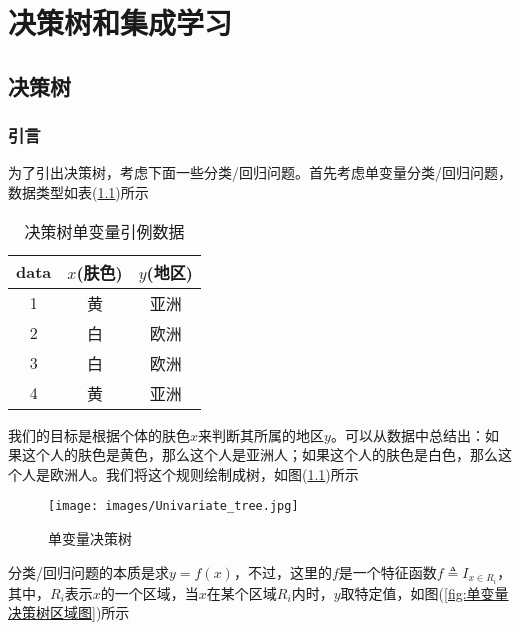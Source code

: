 
\chapter{决策树和集成学习}
\section{决策树}
    \subsection{引言}
        \par
        为了引出决策树，考虑下面一些分类/回归问题。首先考虑单变量分类/回归问题，数据类型如表(\ref{决策树单变量引例数据})所示
        \begin{table}[H]
        \caption{决策树单变量引例数据}
        \label{决策树单变量引例数据}
        \centering
        \begin{tabular}{c|cc}
        \toprule
        data   & $x$(肤色)    & $y$(地区)   \\
        \midrule
        1      & 黄      & 亚洲   \\
        2      & 白      & 欧洲   \\
        3      & 白      & 欧洲   \\
        4      & 黄      & 亚洲   \\
        \bottomrule
        \end{tabular}
        \end{table}
        我们的目标是根据个体的肤色$x$来判断其所属的地区$y$。可以从数据中总结出：如果这个人的肤色是黄色，那么这个人是亚洲人；如果这个人的肤色是白色，那么这个人是欧洲人。我们将这个规则绘制成树，如图(\ref{fig:单变量决策树})所示
                \begin{figure}[H]
                \centering
                \texttt{[image: images/Univariate\_tree.jpg]}
                \caption{单变量决策树}
                \label{fig:单变量决策树}
                \end{figure}
        分类/回归问题的本质是求$y = f(x)$，不过，这里的$f$是一个特征函数$f \triangleq I_{x\in R_i}$，其中，$R_i$表示$x$的一个区域，当$x$在某个区域$R_i$内时，$y$取特定值，如图(\ref{fig:单变量决策树区域图})所示
